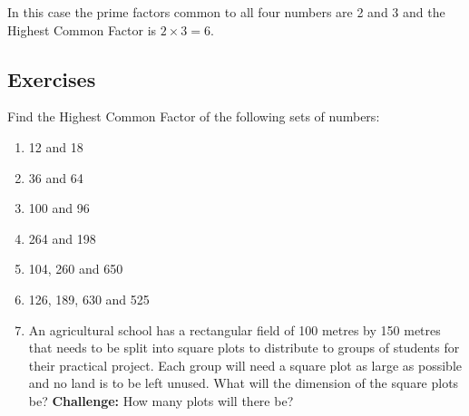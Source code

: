 \documentclass[11pt, oneside]{article}
\theoremstyle{definition}
\begin{document}
In this case the prime factors common to all four numbers are 2 and 3 and the Highest Common Factor is $2\times 3 = 6$.


\subsection{Exercises}
Find the Highest Common Factor of the following sets of numbers:
\begin{enumerate}
\item 12 and 18
\item 36 and 64
\item 100 and 96
\item 264 and 198
\item 104, 260 and 650
\item 126, 189, 630 and 525
\bigbreak
\item An agricultural school has a rectangular field of 100 metres by 150 metres that needs to be split into square plots to distribute to groups of students for their practical project. Each group will need a square plot as large as possible and no land is to be left unused. What will the dimension of the square plots be? {\bf Challenge:} How many plots will there be?
\end{enumerate}
\end{document}
